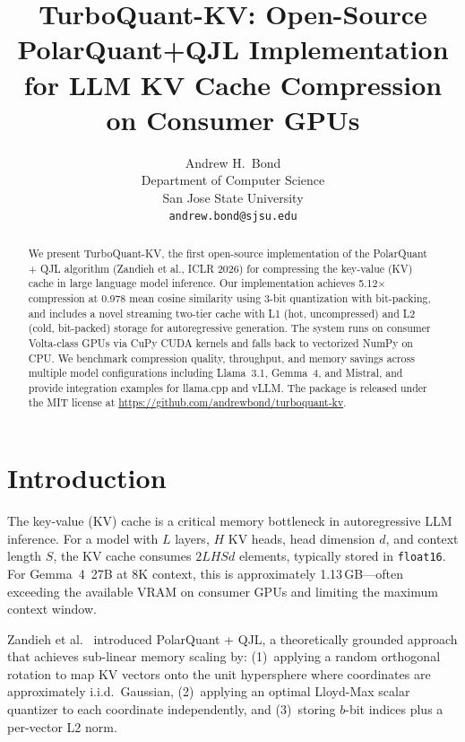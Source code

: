 \documentclass{article}
\title{TurboQuant-KV: Open-Source PolarQuant+QJL Implementation \\
for LLM KV Cache Compression on Consumer GPUs}
\author{
  Andrew H.\ Bond \\
  Department of Computer Science \\
  San Jose State University \\
  \texttt{andrew.bond@sjsu.edu}
}
\begin{document}
\maketitle

\begin{abstract}
We present TurboQuant-KV, the first open-source implementation of the
PolarQuant + QJL algorithm (Zandieh et al., ICLR 2026) for compressing
the key-value (KV) cache in large language model inference.  Our
implementation achieves 5.12$\times$ compression at 0.978 mean cosine
similarity using 3-bit quantization with bit-packing, and includes a
novel streaming two-tier cache with L1 (hot, uncompressed) and L2
(cold, bit-packed) storage for autoregressive generation.  The system
runs on consumer Volta-class GPUs via CuPy CUDA kernels and falls back
to vectorized NumPy on CPU.  We benchmark compression quality,
throughput, and memory savings across multiple model configurations
including Llama~3.1, Gemma~4, and Mistral, and provide integration
examples for llama.cpp and vLLM.  The package is released under the
MIT license at \url{https://github.com/andrewbond/turboquant-kv}.
\end{abstract}

\section{Introduction}
\label{sec:intro}

The key-value (KV) cache is a critical memory bottleneck in autoregressive
LLM inference.  For a model with $L$ layers, $H$ KV heads, head dimension
$d$, and context length $S$, the KV cache consumes $2LHSd$ elements,
typically stored in \texttt{float16}.  For Gemma~4~27B at 8K context, this
is approximately 1.13\,GB---often exceeding the available VRAM on consumer
GPUs and limiting the maximum context window.

Zandieh et al.~\cite{zandieh2026sublinear} introduced PolarQuant + QJL, a
theoretically grounded approach that achieves sub-linear memory scaling by:
(1)~applying a random orthogonal rotation to map KV vectors onto the unit
hypersphere where coordinates are approximately i.i.d.\ Gaussian,
(2)~applying an optimal Lloyd-Max scalar quantizer to each coordinate
independently, and (3)~storing $b$-bit indices plus a per-vector L2 norm.
\end{document}
